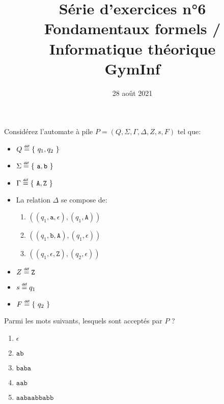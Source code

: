 \documentclass[12pt,french,a4paper]{article}
\newcommand\eqdef{\mathrel{\overset{\makebox[0pt]{\mbox{\normalfont\tiny\sffamily déf}}}{=}}}
\begin{document}
\title{\vspace{-2cm}Série d'exercices n°6\\\large{Fondamentaux formels / Informatique théorique\\GymInf}}
\date{\vspace{-1cm}28 août 2021}

\maketitle

\begin{question}

Considérez l'automate à pile $P = (Q, \Sigma, \Gamma, \Delta, Z, s, F)$ tel que:
\begin{itemize}
\item $Q \eqdef \{\ q_1, q_2\ \}$
\item $\Sigma \eqdef \{\ \texttt{a}, \texttt{b}\ \}$
\item $\Gamma \eqdef \{\ \texttt{A}, \texttt{Z}\ \}$
\item La relation $\Delta$ se compose de:
\begin{enumerate}
\item $((q_1, \texttt{a}, \epsilon), (q_1, \texttt{A}))$
\item $((q_1, \texttt{b}, \texttt{A}), (q_1, \epsilon))$
\item $((q_1, \epsilon, \texttt{Z}), (q_2, \epsilon))$
\end{enumerate}
\item $Z \eqdef \texttt{Z}$
\item $s \eqdef q_1$
\item $F \eqdef \{\ q_2\ \}$
\end{itemize}
\end{question}

Parmi les mots suivants, lesquels sont acceptés par $P$ ?
\begin{enumerate}
\item $\epsilon$
\item $\texttt{ab}$
\item $\texttt{baba}$
\item $\texttt{aab}$
\item $\texttt{aabaabbabb}$
\end{enumerate}

\vspace{2cm}
\end{document}
